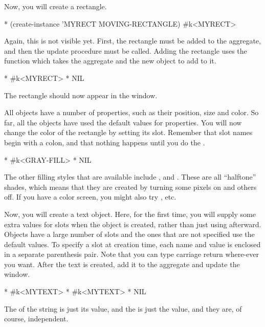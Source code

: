 Now, you will create a rectangle.
\begin{programexample}
* (create-instance 'MYRECT MOVING-RECTANGLE)
\#k<MYRECT>
\end{programexample}

Again, this is not visible yet.  First, the rectangle must be added to the
aggregate, and then the update procedure must be called.  Adding the
rectangle uses the function
 which takes the aggregate and the new object to add to
it.
\begin{programexample}
* 
\#k<MYRECT>
* 
NIL
\end{programexample}

The rectangle should now appear in the window.

All objects have a number of properties,
such as their position, size and color.  So far, all the objects have used
the default values for properties.  You will now change the color of the
rectangle by setting its  slot.  Remember that slot
names begin with a colon, and that nothing happens until you do the
.
\begin{programexample}
* 
\#k<GRAY-FILL>
* 
NIL
\end{programexample}

The other filling styles that are available include , and
.  These are all ``halftone'' shades, which
means that they are created by turning some pixels on and others off.
If you have a color screen, you might also try , etc.

Now, you will create a text object.  Here, for the first time, you will
supply some extra values for slots when the object is created, rather than
just using  afterward.  Objects have a large number of slots
and the ones that are not specified use the default values.
To specify a slot at creation time, each name and value is
enclosed in a separate parenthesis pair.  Note that you can type carriage
return where-ever you want.  After the text is created, add it to the
aggregate and update the window.
\begin{programexample}
* 
\#k<MYTEXT>
* 
\#k<MYTEXT>
* 
NIL
\end{programexample}
The  of the string is just its  value, and the  is
just the  value, and they are, of course, independent.

